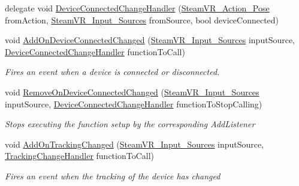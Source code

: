 \begin{DoxyCompactItemize}
\item 
delegate void \mbox{\hyperlink{class_valve_1_1_v_r_1_1_steam_v_r___action___pose_a40c6d9862680e8c99781b3a109d94b82}{Device\+Connected\+Change\+Handler}} (\mbox{\hyperlink{class_valve_1_1_v_r_1_1_steam_v_r___action___pose}{Steam\+V\+R\+\_\+\+Action\+\_\+\+Pose}} from\+Action, \mbox{\hyperlink{namespace_valve_1_1_v_r_a82e5bf501cc3aa155444ee3f0662853f}{Steam\+V\+R\+\_\+\+Input\+\_\+\+Sources}} from\+Source, bool device\+Connected)
\item 
void \mbox{\hyperlink{class_valve_1_1_v_r_1_1_steam_v_r___action___pose_a402f4eeaffab4e2da4c6c1c07df93da5}{Add\+On\+Device\+Connected\+Changed}} (\mbox{\hyperlink{namespace_valve_1_1_v_r_a82e5bf501cc3aa155444ee3f0662853f}{Steam\+V\+R\+\_\+\+Input\+\_\+\+Sources}} input\+Source, \mbox{\hyperlink{class_valve_1_1_v_r_1_1_steam_v_r___action___pose_a40c6d9862680e8c99781b3a109d94b82}{Device\+Connected\+Change\+Handler}} function\+To\+Call)
\begin{DoxyCompactList}\small\item\em Fires an event when a device is connected or disconnected. \end{DoxyCompactList}\item 
void \mbox{\hyperlink{class_valve_1_1_v_r_1_1_steam_v_r___action___pose_a54898147219ffbaedaaac791123327b2}{Remove\+On\+Device\+Connected\+Changed}} (\mbox{\hyperlink{namespace_valve_1_1_v_r_a82e5bf501cc3aa155444ee3f0662853f}{Steam\+V\+R\+\_\+\+Input\+\_\+\+Sources}} input\+Source, \mbox{\hyperlink{class_valve_1_1_v_r_1_1_steam_v_r___action___pose_a40c6d9862680e8c99781b3a109d94b82}{Device\+Connected\+Change\+Handler}} function\+To\+Stop\+Calling)
\begin{DoxyCompactList}\small\item\em Stops executing the function setup by the corresponding Add\+Listener \end{DoxyCompactList}\item 
void \mbox{\hyperlink{class_valve_1_1_v_r_1_1_steam_v_r___action___pose_ae0f2f16ddb64f4acf9842851ce9f437c}{Add\+On\+Tracking\+Changed}} (\mbox{\hyperlink{namespace_valve_1_1_v_r_a82e5bf501cc3aa155444ee3f0662853f}{Steam\+V\+R\+\_\+\+Input\+\_\+\+Sources}} input\+Source, \mbox{\hyperlink{class_valve_1_1_v_r_1_1_steam_v_r___action___pose_a52e352705659c14685cf8a88ef4bafd6}{Tracking\+Change\+Handler}} function\+To\+Call)
\begin{DoxyCompactList}\small\item\em Fires an event when the tracking of the device has changed \end{DoxyCompactList}\item 

\end{DoxyCompactItemize}
